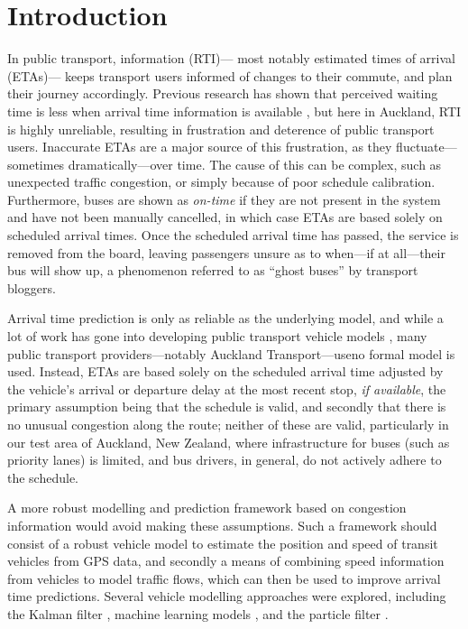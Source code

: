 \section{Introduction}
\label{sec:intro}


In public transport, \rt information (RTI)---%
most notably estimated times of arrival (ETAs)---%
keeps transport users informed of changes to their commute,
and plan their journey accordingly.
Previous research has shown that perceived waiting time is less
when arrival time information is available \citep{TCRP_2003b},
but here in Auckland, RTI is highly unreliable,
resulting in frustration and deterence of public transport users.
Inaccurate ETAs are a major source of this frustration,
as they fluctuate---sometimes dramatically---over time.
The cause of this can be complex, such as unexpected traffic congestion,
or simply because of poor schedule calibration.
Furthermore, buses are shown as \emph{on-time} 
if they are not present in the \rt system and have not been manually cancelled,
in which case ETAs are based solely on scheduled arrival times.
Once the scheduled arrival time has passed,
the service is removed from the \rt board,
leaving passengers unsure as to when---if at all---their bus will show up,
a phenomenon referred to as ``ghost buses'' by transport bloggers.


Arrival time prediction is only as reliable as the underlying model,
and while a lot of work has gone into developing public transport vehicle models
\citep{Cathey_2003,Jeong_2005,Yu_2011,Hans_2015},
many public transport providers---notably Auckland Transport---useno formal model is used.
Instead, ETAs are based solely on the scheduled arrival time
adjusted by the vehicle's arrival or departure delay at the most recent stop, 
\emph{if available},
the primary assumption being that the schedule is valid,
and secondly that there is no unusual congestion along the route;
neither of these are valid,
particularly in our test area of Auckland, New Zealand,
where infrastructure for buses (such as priority lanes) is limited,
and bus drivers, in general, 
do not actively adhere to the schedule.


A more robust modelling and prediction framework 
based on \rt congestion information would avoid making these assumptions.
Such a framework should consist of a robust vehicle model to estimate the position and speed
of transit vehicles from \rt GPS data,
and secondly a means of combining speed information from vehicles
to model traffic flows,
which can then be used to improve arrival time predictions.
Several vehicle modelling approaches were explored, 
including the Kalman filter \citep{Dailey_2001,Cathey_2003},
machine learning models \citep{Yu_2006,Chang_2010},
and the particle filter \citep{Hans_2015}.


